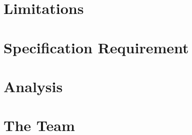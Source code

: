 \documentclass[twoside]{report}
\newcommand{\marginquote}[1]{\marginpar{\textcolor{gray}{\large\itshape\fontfamily{ppl}\selectfont``#1''}}}
\begin{document}
\section{Limitations}

\section{Specification Requirement}

\section{Analysis}

\section{The Team}

\end{document}
